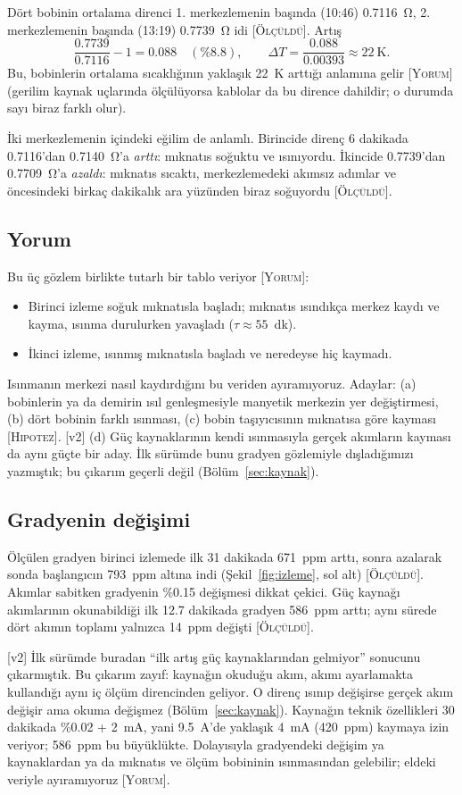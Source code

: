\documentclass[11pt,a4paper]{article}
\newcommand{\olc}{\textsc{[Ölçüldü]}}
\newcommand{\yor}{\textsc{[Yorum]}}
\newcommand{\hip}{\textsc{[Hipotez]}}
\begin{document}
Dört bobinin ortalama direnci 1. merkezlemenin başında (10:46) 0.7116~Ω, 2. merkezlemenin başında (13:19)
0.7739~Ω idi \olc. Artış
\[
  \frac{0.7739}{0.7116} - 1 = 0.088 \quad (\%8.8),\qquad
  \Delta T = \frac{0.088}{0.00393} \approx 22\ \text{K}.
\]
Bu, bobinlerin ortalama sıcaklığının yaklaşık 22~K arttığı anlamına gelir \yor{} (gerilim kaynak
uçlarında ölçülüyorsa kablolar da bu dirence dahildir; o durumda sayı biraz farklı olur).

İki merkezlemenin içindeki eğilim de anlamlı. Birincide direnç 6 dakikada 0.7116'dan 0.7140~Ω'a
\emph{arttı}: mıknatıs soğuktu ve ısınıyordu. İkincide 0.7739'dan 0.7709~Ω'a \emph{azaldı}: mıknatıs sıcaktı,
merkezlemedeki akımsız adımlar ve öncesindeki birkaç dakikalık ara yüzünden biraz soğuyordu \olc.

\subsection{Yorum}
Bu üç gözlem birlikte tutarlı bir tablo veriyor \yor:
\begin{itemize}
\item Birinci izleme soğuk mıknatısla başladı; mıknatıs ısındıkça merkez kaydı ve kayma, ısınma durulurken
yavaşladı ($\tau \approx 55$~dk).
\item İkinci izleme, ısınmış mıknatısla başladı ve neredeyse hiç kaymadı.
\end{itemize}
Isınmanın merkezi nasıl kaydırdığını bu veriden ayıramıyoruz. Adaylar: (a) bobinlerin ya da demirin ısıl
genleşmesiyle manyetik merkezin yer değiştirmesi, (b) dört bobinin farklı ısınması, (c) bobin taşıyıcısının
mıknatısa göre kayması \hip. [v2] (d) Güç kaynaklarının kendi ısınmasıyla gerçek akımların kayması da aynı
güçte bir aday. İlk sürümde bunu gradyen gözlemiyle dışladığımızı yazmıştık; bu çıkarım geçerli değil
(Bölüm~\ref{sec:kaynak}).

\subsection{Gradyenin değişimi}
Ölçülen gradyen birinci izlemede ilk 31 dakikada 671~ppm arttı, sonra azalarak sonda başlangıcın
793~ppm altına indi (Şekil~\ref{fig:izleme}, sol alt) \olc. Akımlar sabitken gradyenin \%0.15 değişmesi
dikkat çekici. Güç kaynağı akımlarının okunabildiği ilk 12.7 dakikada gradyen 586~ppm arttı; aynı sürede
dört akımın toplamı yalnızca 14~ppm değişti \olc.

[v2] İlk sürümde buradan ``ilk artış güç kaynaklarından gelmiyor'' sonucunu çıkarmıştık. Bu çıkarım
zayıf: kaynağın okuduğu akım, akımı ayarlamakta kullandığı aynı iç ölçüm direncinden geliyor. O direnç
ısınıp değişirse gerçek akım değişir ama okuma değişmez (Bölüm~\ref{sec:kaynak}). Kaynağın teknik
özellikleri 30 dakikada \%0.02 + 2~mA, yani 9.5~A'de yaklaşık 4~mA (420~ppm) kaymaya izin veriyor; 586~ppm bu
büyüklükte. Dolayısıyla gradyendeki değişim ya kaynaklardan ya da mıknatıs ve ölçüm bobininin ısınmasından
gelebilir; eldeki veriyle ayıramıyoruz \yor.
\end{document}
